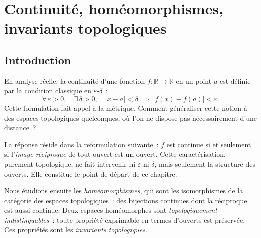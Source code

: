 \documentclass[12pt,a4paper,openany]{book}
\theoremstyle{definition}
\theoremstyle{cours}
\theoremstyle{coursnormal}
\newcommand{\R}{\mathbb{R}}
\begin{document}
%
%

\chapter{Continuité, homéomorphismes, invariants topologiques}%
\label{ch:continuite-homeomorphismes}

\section*{Introduction}

En analyse réelle, la continuité d'une fonction $f\colon\R\to\R$ en un point
$a$ est définie par la condition classique en $\varepsilon$-$\delta$~:
\[
  \forall\,\varepsilon>0,\quad \exists\,\delta>0,\quad
  |x-a|<\delta \;\Longrightarrow\; |f(x)-f(a)|<\varepsilon.
\]
Cette formulation fait appel à la métrique. Comment généraliser cette notion à
des espaces topologiques quelconques, où l'on ne dispose pas nécessairement
d'une distance~?

\medskip

La réponse réside dans la reformulation suivante~: $f$ est continue si et
seulement si l'\emph{image réciproque} de tout ouvert est un ouvert. Cette
caractérisation, purement topologique, ne fait intervenir ni $\varepsilon$ ni
$\delta$, mais seulement la structure des ouverts. Elle constitue le point de
départ de ce chapitre.

\medskip

Nous étudions ensuite les \emph{homéomorphismes}, qui sont les isomorphismes
de la catégorie des espaces topologiques~: des bijections continues dont la
réciproque est aussi continue. Deux espaces homéomorphes sont
\emph{topologiquement indistinguables}~: toute propriété exprimable en termes
d'ouverts est préservée. Ces propriétés sont les \emph{invariants
topologiques}.
\end{document}
